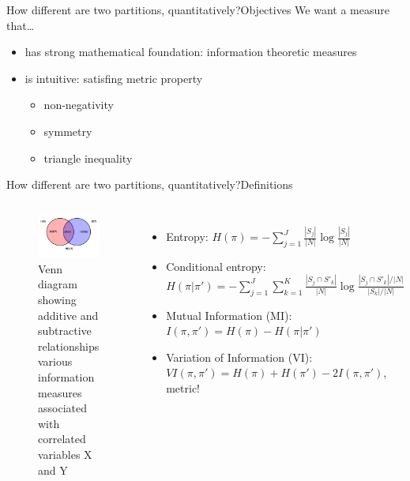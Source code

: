 \documentclass[xcolor=dvipsnames]{beamer}
\newcommand{\I}{\mathit{I}}
\newcommand{\VI}{\mathit{VI}}
\begin{document}
\begin{frame}{How different are two partitions, quantitatively?}{Objectives}
  We want a measure that\ldots
  \begin{itemize}
    \item has strong mathematical foundation: information theoretic measures
    \item is intuitive: satisfing metric property
    \begin{itemize}
      \item non-negativity
      \item symmetry
      \item triangle inequality
    \end{itemize}
  \end{itemize}
\end{frame}

\begin{frame}{How different are two partitions, quantitatively?}{Definitions}
  \begin{columns}
  \begin{figure}
    \includegraphics[width=\linewidth]{entropy-relation-diagram}
    \caption{Venn diagram showing additive and subtractive relationships various information measures associated with correlated variables X and Y}
  \end{figure}
  \begin{itemize}
    \item Entropy: $H(\pi) = - \sum^J_{j=1} \frac{|S_j|}{|N|} \log{\frac{|S_j|}{|N|}}$
    \item Conditional entropy: $H(\pi|\pi') = - \sum^J_{j=1} \sum^K_{k=1} \frac{|S_j \cap S'_k|}{|N|} \log{\frac{|S_j \cap S'_k|/|N|}{|S_k|/|N|}}$
    \item Mutual Information (MI): $\I(\pi, \pi') = H(\pi) - H(\pi|\pi')$
    \item Variation of Information (VI): $\VI(\pi, \pi') = H(\pi) + H(\pi') - 2\I(\pi, \pi')$, metric!
  \end{itemize}
  \end{columns}
\end{frame}
\end{document}
